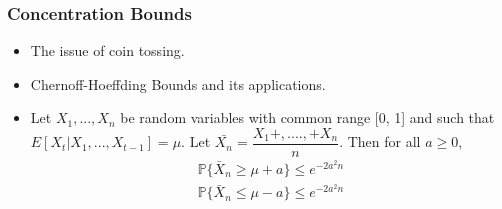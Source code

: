 \begin{frame}
\frametitle{Concentration Bounds}
\begin{itemize}
\item<1-> The issue of coin tossing.
\item<2-> Chernoff-Hoeffding Bounds and its applications.
\item<3-> Let $X_{1}, . . . , X_{n}$ be random variables with common
range [0, 1] and such that $E[X_{t} |X_{1}, . . . , X_{t-1}] = \mu.$ Let $\bar{X_n} = \dfrac{X_{1} +,....,+ X_{n}}{n}$. Then for all $a \geq 0$,
\begin{align*}
\mathbb{P} \lbrace \bar{X}_{n} \geq \mu + a \rbrace \leq e^{-2a^{2}n}\\
\mathbb{P}\lbrace \bar{X}_{n} \leq \mu - a \rbrace \leq e^{-2a^{2}n}
\end{align*}
\end{itemize}
\end{frame}